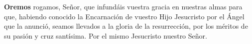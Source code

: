 \textbf{Oremos}
 rogamos, Señor, que infundáis vuestra gracia en nuestras almas para que,
habiendo conocido la Encarnación de vuestro Hijo Jesucristo por el Ángel que la anunció,
seamos llevados a la gloria de la resurrección, por los méritos de su pasión y cruz santísima.
Por el mismo Jesucristo nuestro Señor.\\[1mm]
